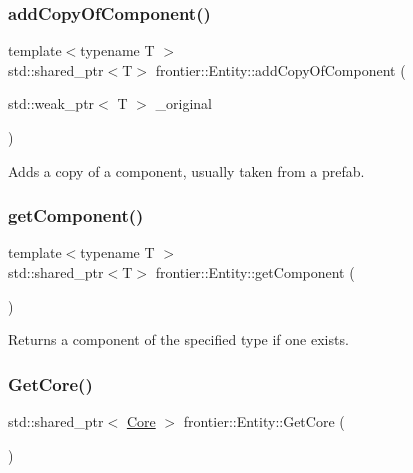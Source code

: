 \subsubsection{\texorpdfstring{add\+Copy\+Of\+Component()}{addCopyOfComponent()}}
{\footnotesize\ttfamily template$<$typename T $>$ \\
std\+::shared\+\_\+ptr$<$T$>$ frontier\+::\+Entity\+::add\+Copy\+Of\+Component (\begin{DoxyParamCaption}\item[{std\+::weak\+\_\+ptr$<$ T $>$}]{\+\_\+original }\end{DoxyParamCaption})\hspace{0.3cm}{\ttfamily [inline]}}



Adds a copy of a component, usually taken from a prefab. 

\mbox{\label{classfrontier_1_1_entity_a7657bce9cd7f405f69e59c61a69adf86}} 
\subsubsection{\texorpdfstring{get\+Component()}{getComponent()}}
{\footnotesize\ttfamily template$<$typename T $>$ \\
std\+::shared\+\_\+ptr$<$T$>$ frontier\+::\+Entity\+::get\+Component (\begin{DoxyParamCaption}{ }\end{DoxyParamCaption})\hspace{0.3cm}{\ttfamily [inline]}}



Returns a component of the specified type if one exists. 

\mbox{\label{classfrontier_1_1_entity_af1c56e995259d4cef5221dbc3304b819}} 
\subsubsection{\texorpdfstring{Get\+Core()}{GetCore()}}
{\footnotesize\ttfamily std\+::shared\+\_\+ptr$<$ \hyperlink{classfrontier_1_1_core}{Core} $>$ frontier\+::\+Entity\+::\+Get\+Core (\begin{DoxyParamCaption}{ }\end{DoxyParamCaption})}



